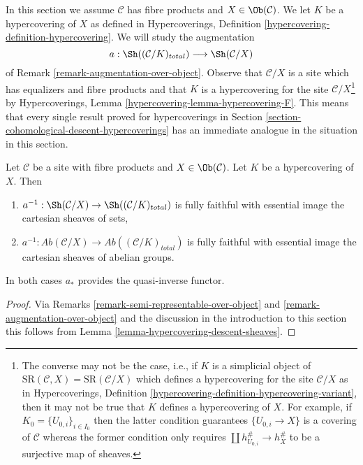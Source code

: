 \noindent
In this section we assume $\mathcal{C}$ has fibre products
and $X \in \Ob(\mathcal{C})$. We let $K$ be a hypercovering of $X$
as defined in
Hypercoverings, Definition \ref{hypercovering-definition-hypercovering}.
We will study the augmentation
$$
a : \Sh((\mathcal{C}/K)_{total}) \longrightarrow \Sh(\mathcal{C}/X)
$$
of Remark \ref{remark-augmentation-over-object}.
Observe that $\mathcal{C}/X$ is a site which has equalizers
and fibre products and that $K$ is a
hypercovering for the site $\mathcal{C}/X$\footnote{The converse may not
be the case, i.e., if $K$ is a simplicial object of
$\text{SR}(\mathcal{C}, X) = \text{SR}(\mathcal{C}/X)$
which defines a hypercovering for the site $\mathcal{C}/X$ as in
Hypercoverings, Definition \ref{hypercovering-definition-hypercovering-variant},
then it may not be true that $K$ defines a hypercovering of $X$.
For example, if $K_0 = \{U_{0, i}\}_{i \in I_0}$
then the latter condition guarantees
$\{U_{0, i} \to X\}$ is a covering of $\mathcal{C}$
whereas the former condition only requires
$\coprod h_{U_{0, i}}^\# \to h_X^\#$ to be a surjective map
of sheaves.} by Hypercoverings, Lemma
\ref{hypercovering-lemma-hypercovering-F}.
This means that every single result proved for hypercoverings
in Section \ref{section-cohomological-descent-hypercoverings}
has an immediate analogue in the situation in this section.

\begin{lemma}
\label{lemma-hypercovering-X-descent-sheaves}
Let $\mathcal{C}$ be a site with fibre products and $X \in \Ob(\mathcal{C})$.
Let $K$ be a hypercovering of $X$. Then
\begin{enumerate}
\item $a^{-1} : \Sh(\mathcal{C}/X) \to \Sh((\mathcal{C}/K)_{total})$
is fully faithful with essential image the cartesian sheaves of sets,
\item $a^{-1} : \textit{Ab}(\mathcal{C}/X) \to
\textit{Ab}((\mathcal{C}/K)_{total})$
is fully faithful with essential image the cartesian sheaves
of abelian groups.
\end{enumerate}
In both cases $a_*$ provides the quasi-inverse functor.
\end{lemma}

\begin{proof}
Via Remarks \ref{remark-semi-representable-over-object} and
\ref{remark-augmentation-over-object} and the discussion in
the introduction to this section
this follows from Lemma \ref{lemma-hypercovering-descent-sheaves}.
\end{proof}

